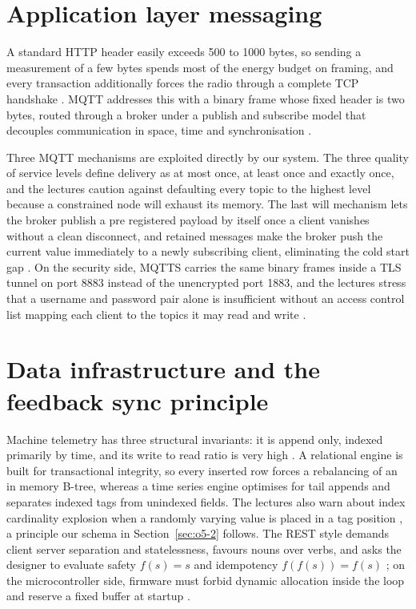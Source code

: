 \section{Application layer messaging}
\label{sec:o2-4}

A standard HTTP header easily exceeds 500 to 1000 bytes, so sending a measurement of a few bytes spends most of the energy budget on framing, and every transaction additionally forces the radio through a complete TCP handshake \cite{slide03}. MQTT addresses this with a binary frame whose fixed header is two bytes, routed through a broker under a publish and subscribe model that decouples communication in space, time and synchronisation \cite{slide03, mqtt311}.

Three MQTT mechanisms are exploited directly by our system. The three quality of service levels define delivery as at most once, at least once and exactly once, and the lectures caution against defaulting every topic to the highest level because a constrained node will exhaust its memory. The last will mechanism lets the broker publish a pre registered payload by itself once a client vanishes without a clean disconnect, and retained messages make the broker push the current value immediately to a newly subscribing client, eliminating the cold start gap \cite{slide03}. On the security side, MQTTS carries the same binary frames inside a TLS tunnel on port 8883 instead of the unencrypted port 1883, and the lectures stress that a username and password pair alone is insufficient without an access control list mapping each client to the topics it may read and write \cite{slide03, rfc8446}.

\section{Data infrastructure and the feedback sync principle}
\label{sec:o2-5}

Machine telemetry has three structural invariants: it is append only, indexed primarily by time, and its write to read ratio is very high \cite{slide04}. A relational engine is built for transactional integrity, so every inserted row forces a rebalancing of an in memory B-tree, whereas a time series engine optimises for tail appends and separates indexed tags from unindexed fields. The lectures also warn about index cardinality explosion when a randomly varying value is placed in a tag position \cite{slide04}, a principle our schema in Section~\ref{sec:o5-2} follows. The REST style demands client server separation and statelessness, favours nouns over verbs, and asks the designer to evaluate safety $f(s)=s$ and idempotency $f(f(s))=f(s)$ \cite{fielding2000, slide05}; on the microcontroller side, firmware must forbid dynamic allocation inside the loop and reserve a fixed buffer at startup \cite{slide05, arduinojson}.

